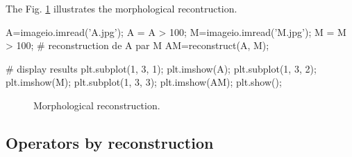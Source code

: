 The Fig. \ref{python:bw_mm:reconstruction} illustrates the morphological recontruction.
\begin{python}
A=imageio.imread('A.jpg');
A = A > 100;
M=imageio.imread('M.jpg');
M = M > 100;
# reconstruction de A par M
AM=reconstruct(A, M);

# display results
plt.subplot(1, 3, 1);
plt.imshow(A);
plt.subplot(1, 3, 2);
plt.imshow(M);
plt.subplot(1, 3, 3);
plt.imshow(AM);
plt.show();
\end{python}
\vspace*{-10pt}
\begin{figure}[htbp]
 \centering\caption{Morphological reconstruction.}%
 \hfill
 \hfill
 \label{python:bw_mm:reconstruction}\vspace*{-8pt}%
\end{figure}

\vspace*{-10pt}

\subsection{Operators by reconstruction}
